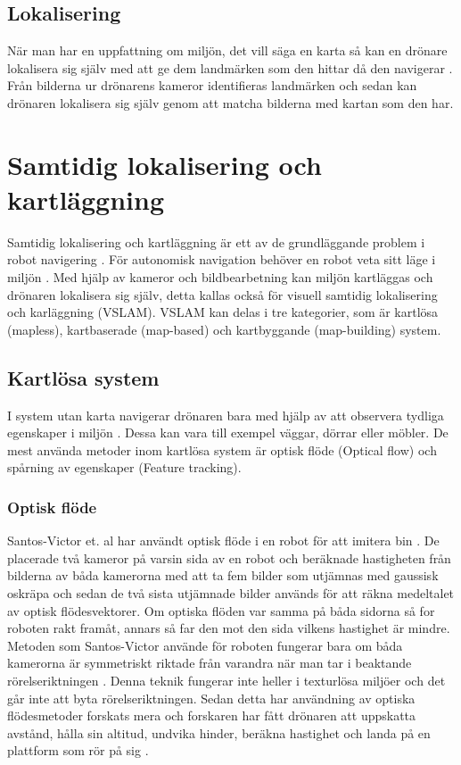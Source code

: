 \section{Lokalisering}

När man har en uppfattning om miljön, det vill säga en karta så kan en drönare lokalisera sig själv med att ge dem landmärken som den hittar då den navigerar \citep{982903}. Från bilderna ur drönarens kameror identifieras landmärken och sedan kan drönaren lokalisera sig själv genom att matcha bilderna med kartan som den har.

\chapter{Samtidig lokalisering och kartläggning}

Samtidig lokalisering och kartläggning är ett av de grundläggande problem i robot navigering \citep{slamproblem}. För autonomisk navigation behöver en robot veta sitt läge i miljön \citep{geospatial}. Med hjälp av kameror och bildbearbetning kan miljön kartläggas och drönaren lokalisera sig själv, detta kallas också för visuell samtidig lokalisering och karläggning (VSLAM). VSLAM kan delas i tre kategorier, som är kartlösa (mapless), kartbaserade (map-based) och kartbyggande (map-building) system. 

\section{Kartlösa system}

I system utan karta navigerar drönaren bara med hjälp av att observera tydliga egenskaper i miljön \citep{982903}. Dessa kan vara till exempel väggar, dörrar eller möbler. De mest använda metoder inom kartlösa system är optisk flöde (Optical flow) och spårning av egenskaper (Feature tracking). 

\subsection{Optisk flöde}

Santos-Victor et. al har användt optisk flöde i en robot för att imitera bin \citep{341094}. De placerade två kameror på varsin sida av en robot och beräknade hastigheten från bilderna av båda kamerorna med att ta fem bilder som utjämnas med gaussisk oskräpa och sedan de två sista utjämnade bilder används för att räkna medeltalet av optisk flödesvektorer. Om optiska flöden var samma på båda sidorna så for roboten rakt framåt, annars så far den mot den sida vilkens hastighet är mindre. Metoden som Santos-Victor använde för roboten fungerar bara om båda kamerorna är symmetriskt riktade från varandra när man tar i beaktande rörelseriktningen \citep{982903}. Denna teknik fungerar inte heller i texturlösa miljöer och det går inte att byta rörelseriktningen. Sedan detta har användning av optiska flödesmetoder forskats mera och forskaren har fått drönaren att uppskatta avstånd, hålla sin altitud, undvika hinder, beräkna hastighet och landa på en plattform som rör på sig \citep{6564752}.

